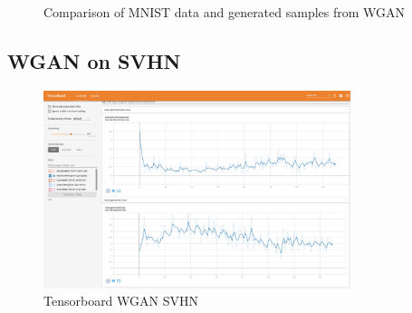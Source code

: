 \documentclass{article}
\begin{document}
\begin{figure}[!htb]
  \centering
  \caption{Comparison of MNIST data and generated samples from WGAN}
\end{figure}

\subsection{WGAN on SVHN}

\begin{figure}[!htb]
  \centering
  \includegraphics[width=0.8\textwidth]{tensorboard-WGAN-SVHN.png}
  \caption{Tensorboard WGAN SVHN}
  \label{fig:TB_WGAN_SVHN}
\end{figure}
\end{document}
